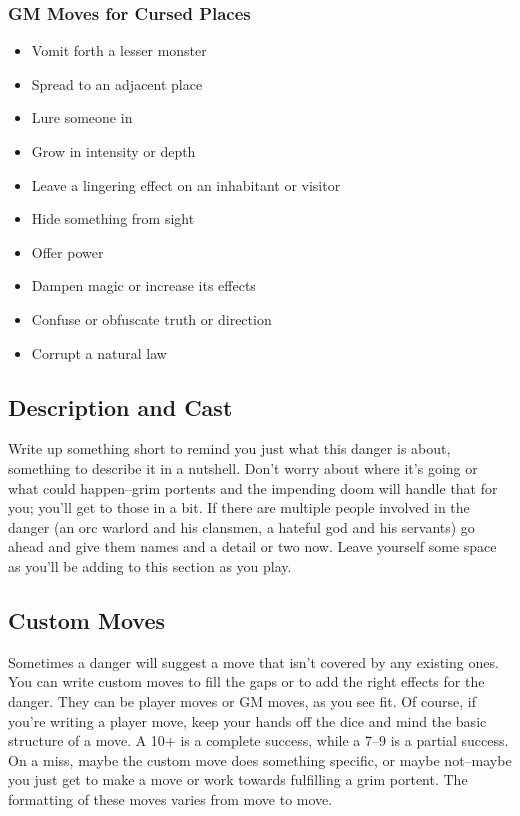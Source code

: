 \subsubsection{GM Moves for Cursed Places}
\begin{itemize}
\item Vomit forth a lesser monster
\item Spread to an adjacent place
\item Lure someone in
\item Grow in intensity or depth
\item Leave a lingering effect on an inhabitant or visitor
\item Hide something from sight
\item Offer power
\item Dampen magic or increase its effects
\item Confuse or obfuscate truth or direction
\item Corrupt a natural law

\end{itemize}
\subsection{Description and Cast}


 Write up something short to remind you just what this danger is about, something to describe it in a nutshell. Don't worry about where it's going or what could happen--grim portents and the impending doom will handle that for you; you'll get to those in a bit. If there are multiple people involved in the danger (an orc warlord and his clansmen, a hateful god and his servants) go ahead and give them names and a detail or two now. Leave yourself some space as you'll be adding to this section as you play.
\subsection{Custom Moves}


 Sometimes a danger will suggest a move that isn't covered by any existing ones. You can write custom moves to fill the gaps or to add the right effects for the danger. They can be player moves or GM moves, as you see fit. Of course, if you're writing a player move, keep your hands off the dice and mind the basic structure of a move. A 10+ is a complete success, while a 7--9 is a partial success. On a miss, maybe the custom move does something specific, or maybe not--maybe you just get to make a move or work towards fulfilling a grim portent. The formatting of these moves varies from move to move.


